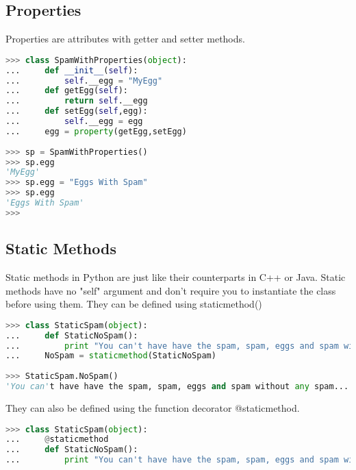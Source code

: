 \subsection{Properties}
Properties are attributes with getter and setter methods.
\lstset{basicstyle=\scriptsize, numbers=left, captionpos=b, tabsize=4}
\begin{lstlisting}[caption=Property Example,language={Python},
xleftmargin=15pt, label=lst:propertyexample]
>>> class SpamWithProperties(object):
...     def __init__(self):
...         self.__egg = "MyEgg"
...     def getEgg(self):
...         return self.__egg
...     def setEgg(self,egg):
...         self.__egg = egg
...     egg = property(getEgg,setEgg)
 
>>> sp = SpamWithProperties()
>>> sp.egg
'MyEgg'
>>> sp.egg = "Eggs With Spam"
>>> sp.egg
'Eggs With Spam'
>>>
\end{lstlisting}

\subsection{Static Methods}
Static methods in Python are just like their counterparts in C++ or Java. Static
methods have no "self" argument and don't require you to instantiate the class
before using them. They can be defined using staticmethod()
\lstset{basicstyle=\scriptsize, numbers=left, captionpos=b, tabsize=4}
\begin{lstlisting}[caption=Static Methode,language={Python},
xleftmargin=15pt, label=lst:staticmethode]
>>> class StaticSpam(object):
...     def StaticNoSpam():
...         print "You can't have have the spam, spam, eggs and spam without any spam... that's disgusting"
...     NoSpam = staticmethod(StaticNoSpam)
 
>>> StaticSpam.NoSpam()
'You can't have have the spam, spam, eggs and spam without any spam... that's disgusting'
\end{lstlisting}

They can also be defined using the function decorator @staticmethod.
\lstset{basicstyle=\scriptsize, numbers=left, captionpos=b, tabsize=4}
\begin{lstlisting}[caption=Another Static Methode,language={Python},
xleftmargin=15pt, label=lst:anotherstaticmethode]
>>> class StaticSpam(object):
...     @staticmethod
...     def StaticNoSpam():
...         print "You can't have have the spam, spam, eggs and spam without any spam... that's disgusting"
\end{lstlisting}

